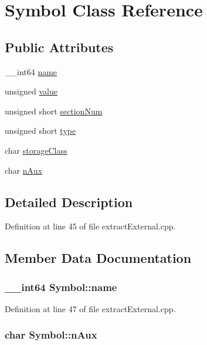 \hypertarget{classSymbol}{\section{Symbol Class Reference}
\label{classSymbol}
}
\subsection*{Public Attributes}
\begin{DoxyCompactItemize}
\item 
\-\_\-\-\_\-int64 \hyperlink{classSymbol_a1ea294c372f99cc041cc6e9cae2cbe2d}{name}
\item 
unsigned \hyperlink{classSymbol_af145cb57db7f42d1f54b6a7dfcb46e1b}{value}
\item 
unsigned short \hyperlink{classSymbol_a088e5306cf802c20f50738f7a6afb1a4}{section\-Num}
\item 
unsigned short \hyperlink{classSymbol_a3d1c4b34c422f08939298bce745210c0}{type}
\item 
char \hyperlink{classSymbol_afea58ac21e64d497b947b39bbca39e28}{storage\-Class}
\item 
char \hyperlink{classSymbol_aacb81895ea51cc26093dfb62a856f9a0}{n\-Aux}
\end{DoxyCompactItemize}


\subsection{Detailed Description}


Definition at line 45 of file extract\-External.\-cpp.



\subsection{Member Data Documentation}
\hypertarget{classSymbol_a1ea294c372f99cc041cc6e9cae2cbe2d}{
\subsubsection[{name}]{\setlength{\rightskip}{0pt plus 5cm}\-\_\-\-\_\-int64 Symbol\-::name}}\label{classSymbol_a1ea294c372f99cc041cc6e9cae2cbe2d}


Definition at line 47 of file extract\-External.\-cpp.

\hypertarget{classSymbol_aacb81895ea51cc26093dfb62a856f9a0}{
\subsubsection[{n\-Aux}]{\setlength{\rightskip}{0pt plus 5cm}char Symbol\-::n\-Aux}}\label{classSymbol_aacb81895ea51cc26093dfb62a856f9a0}


